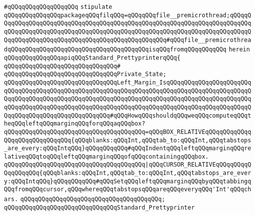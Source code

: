 \verb|#qQQqqQQqqQQqqQQqqQQq|\newline
\newline
\verb|stipulate|\newline
\verb|qQQqqQQqqQQqqQQqpackageqQQqfilqQQq=qQQqqQQqfile__premicrothread;qQQqqQQqqQQqqQQqqQQqqQQqqQQqqQQqqQQqqQQqqQQqqQQqqQQqqQQqqQQqqQQqqQQqqQQqqQQqqQQqqQQqqQQqqQQqqQQqqQQqqQQqqQQqqQQqqQQqqQQqqQQqqQQqqQQqqQQqqQQqqQQqqQQqqQQqqQQqqQQqqQQqqQQqqQQqqQQqqQQqqQQqqQQqqQQq#qQQqfile__premicrothreadqQQqqQQqqQQqqQQqqQQqqQQqqQQqqQQqqQQqqQQqisqQQqfromqQQqqQQqqQQq|\newline
\verb|herein|\newline
\newline
\verb|qQQqqQQqqQQqqQQqapiqQQqStandard_PrettyprinterqQQq{|\newline
\verb|qQQqqQQqqQQqqQQqqQQqqQQqqQQqqQQq#|\newline
\verb|qQQqqQQqqQQqqQQqqQQqqQQqqQQqqQQqPrivate_State;|\newline
\newline
\verb|qQQqqQQqqQQqqQQqqQQqqQQqqQQqqQQqLeft_Margin_IsqQQqqQQqqQQqqQQqqQQqqQQqqQQqqQQqqQQqqQQqqQQqqQQqqQQqqQQqqQQqqQQqqQQqqQQqqQQqqQQqqQQqqQQqqQQqqQQqqQQqqQQqqQQqqQQqqQQqqQQqqQQqqQQqqQQqqQQqqQQqqQQqqQQqqQQqqQQqqQQqqQQqqQQqqQQqqQQqqQQqqQQqqQQqqQQqqQQqqQQqqQQqqQQqqQQqqQQqqQQqqQQqqQQqqQQqqQQqqQQqqQQqqQQqqQQqqQQqqQQqqQQq#qQQqHowqQQqshouldqQQqweqQQqcomputeqQQqtheqQQqleftqQQqmarginqQQqforqQQqaqQQqbox?|\newline
\verb|qQQqqQQqqQQqqQQqqQQqqQQqqQQqqQQqqQQqqQQq=qQQqBOX_RELATIVEqQQqqQQqqQQqqQQqqQQqqQQqqQQqqQQq{qQQqblanks:qQQqInt,qQQqtab_to:qQQqInt,qQQqtabstops_are_every:qQQqIntqQQq}qQQqqQQqqQQq#qQQqIndentqQQqleftqQQqmarginqQQqrelativeqQQqtoqQQqleftqQQqmarginqQQqofqQQqcontainingqQQqbox.|\newline
\verb|qQQqqQQqqQQqqQQqqQQqqQQqqQQqqQQqqQQqqQQq|\verb#|qQQqCURSOR_RELATIVEqQQqqQQqqQQqqQQqqQQq{qQQqblanks:qQQqInt,qQQqtab_to:qQQqInt,qQQqtabstops_are_every:qQQqIntqQQq}qQQqqQQqqQQq#\verb|#qQQqSetqQQqleftqQQqmarginqQQqbyqQQqtabbingqQQqfromqQQqcursor,qQQqwhereqQQqtabstopsqQQqareqQQqeveryqQQq'Int'qQQqchars.|\newline
\verb|qQQqqQQqqQQqqQQqqQQqqQQqqQQqqQQqqQQqqQQq;|\newline
\newline
\verb|qQQqqQQqqQQqqQQqqQQqqQQqqQQqqQQqStandard_Prettyprinter|\newline
